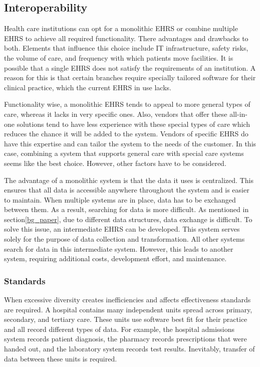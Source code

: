     


    \subsection{Interoperability}\label{bg_interoperability}

    Health care institutions can opt for a monolithic EHRS or combine multiple EHRS to achieve all required functionality. There advantages and drawbacks to both\cite{Payne2012}. Elements that influence this choice include IT infrastructure, safety risks, the volume of care, and frequency with which patients move facilities. It is possible that a single EHRS does not satisfy the requirements of an institution. A reason for this is that certain branches require specially tailored software for their clinical practice, which the current EHRS in use lacks.

    Functionality wise, a monolithic EHRS tends to appeal to more general types of care, whereas it lacks in very specific ones. Also, vendors that offer these all-in-one solutions tend to have less experience with these special types of care which reduces the chance it will be added to the system. Vendors of specific EHRS do have this expertise and can tailor the system to the needs of the customer. In this case, combining a system that supports general care with special care systems seems like the best choice. However, other factors have to be considered.

    The advantage of a monolithic system is that the data it uses is centralized. This ensures that all data is accessible anywhere throughout the system and is easier to maintain. When multiple systems are in place, data has to be exchanged between them. As a result, searching for data is more difficult. As mentioned in section\ref{bg_paper}, due to different data structures, data exchange is difficult. To solve this issue, an intermediate EHRS can be developed. This system serves solely for the purpose of data collection and transformation. All other systems search for data in this intermediate system. However, this leads to another system, requiring additional costs, development effort, and maintenance.

        \subsubsection{Standards}\label{bg_standards}

        When excessive diversity creates inefficiencies and affects effectiveness standards are required\cite{Shortliffe2014}. A hospital contains many independent units spread across primary, secondary, and tertiary care. These units use software best fit for their practice and all record different types of data. For example, the hospital admissions system records patient diagnosis, the pharmacy records prescriptions that were handed out, and the laboratory system records test results. Inevitably, transfer of data between these units is required. 

